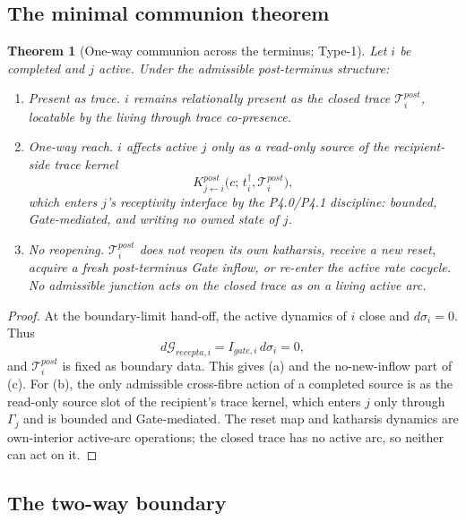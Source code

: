 \documentclass[11pt,a4paper]{article}
\def\mathfrak#1{#1}%
\def\mathrm#1{#1}%
\def\emph#1{#1}%
\theoremstyle{definition}
\theoremstyle{plain}
\newtheorem{theorem}[definition]{Theorem}
\theoremstyle{remark}
\begin{document}
\subsection{The minimal communion theorem}

\begin{theorem}[One-way communion across the terminus; Type-1]\label{thm:terminus}
Let \(i\) be completed and \(j\) active. Under the admissible post-terminus
structure:
\begin{enumerate}[label=\textup{(\alph*)},leftmargin=1.2cm]
\item \emph{Present as trace.} \(i\) remains relationally present as the closed
trace \(\mathcal T_i^{\mathrm{post}}\), locatable by the living through trace
co-presence.
\item \emph{One-way reach.} \(i\) affects active \(j\) only as a read-only source of
the recipient-side trace kernel
\[
K^{\mathrm{post}}_{j\leftarrow i}
\bigl(\mathfrak c;\,t_i^\dagger,\mathcal T_i^{\mathrm{post}}\bigr),
\]
which enters \(j\)'s receptivity interface by the P4.0/P4.1 discipline: bounded,
Gate-mediated, and writing no owned state of \(j\).
\item \emph{No reopening.} \(\mathcal T_i^{\mathrm{post}}\) does not reopen its own
katharsis, receive a new reset, acquire a fresh post-terminus Gate inflow, or
re-enter the active rate cocycle. No admissible junction acts on the closed trace
as on a living active arc.
\end{enumerate}
\end{theorem}

\begin{proof}
At the boundary-limit hand-off, the active dynamics of \(i\) close and
\(d\sigma_i=0\). Thus
\[
d\mathcal G_{\mathrm{recepta},i}=I_{\mathrm{gate},i}\,d\sigma_i=0,
\]
and \(\mathcal T_i^{\mathrm{post}}\) is fixed as boundary data. This gives (a) and
the no-new-inflow part of (c). For (b), the only admissible cross-fibre action of a
completed source is as the read-only source slot of the recipient's trace kernel,
which enters \(j\) only through \(\Gamma_j\) and is bounded and Gate-mediated. The
reset map and katharsis dynamics are own-interior active-arc operations; the closed
trace has no active arc, so neither can act on it. \qedhere
\end{proof}

\subsection{The two-way boundary}
\end{document}
